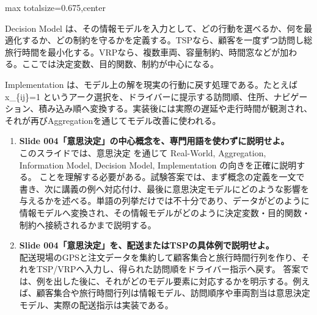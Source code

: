 \begin{adjustbox}{max totalsize={\textwidth}{0.675\textheight},center}
\begin{minipage}{\textwidth}
\begin{minipage}[t]{0.485\textwidth}
Decision Model は、その情報モデルを入力として、どの行動を選べるか、何を最適化するか、どの制約を守るかを定義する。TSPなら、顧客を一度ずつ訪問し総旅行時間を最小化する。VRPなら、複数車両、容量制約、時間窓などが加わる。ここでは決定変数、目的関数、制約が中心になる。\par
Implementation は、モデル上の解を現実の行動に戻す処理である。たとえば x\_\{ij\}=1 というアーク選択を、ドライバーに提示する訪問順、住所、ナビゲーション、積み込み順へ変換する。実装後には実際の遅延や走行時間が観測され、それが再びAggregationを通じてモデル改善に使われる。\par
{}
\begin{enumerate}
\item \textbf{Slide 004「意思決定」の中心概念を、専門用語を使わずに説明せよ。}\\このスライドでは、意思決定 を通じて Real-World, Aggregation, Information Model, Decision Model, Implementation の向きを正確に説明する。 ことを理解する必要がある。試験答案では、まず概念の定義を一文で書き、次に講義の例へ対応付け、最後に意思決定モデルにどのような影響を与えるかを述べる。単語の列挙だけでは不十分であり、データがどのように情報モデルへ変換され、その情報モデルがどのように決定変数・目的関数・制約へ接続されるかまで説明する。
\item \textbf{Slide 004「意思決定」を、配送またはTSPの具体例で説明せよ。}\\配送現場のGPSと注文データを集約して顧客集合と旅行時間行列を作り、それをTSP/VRPへ入力し、得られた訪問順をドライバー指示へ戻す。 答案では、例を出した後に、それがどのモデル要素に対応するかを明示する。例えば、顧客集合や旅行時間行列は情報モデル、訪問順序や車両割当は意思決定モデル、実際の配送指示は実装である。
\end{enumerate}
\end{minipage}
\end{minipage}
\end{adjustbox}

